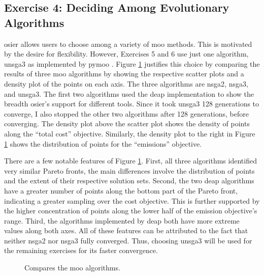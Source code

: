 \subsection{Exercise 4: Deciding Among Evolutionary Algorithms}

\ac{osier} allows users to choose among a variety of \ac{moo} methods. This is
motivated by the desire for flexibility. However, Exercises 5 and 6 use just one
algorithm, \ac{unsga3} as implemented by \ac{pymoo} \cite{blank_pymoo_2020}. Figure
\ref{fig:algorithm-comparison} justifies this choice by comparing the results of
three \ac{moo} algorithms by showing the respective scatter plots and a density
plot of the points on each axis. The three algorithms are \ac{nsga2},
\ac{nsga3}, and \ac{unsga3}. The first two algorithms used the \ac{deap} \cite{fortin_deap_2012}
implementation to show the breadth \ac{osier}'s support for different tools.
Since it took \ac{unsga3} 128 generations to converge, I also stopped the other
two algorithms after 128 generations, before converging. The density plot above
the scatter plot shows the density of points along the ``total cost'' objective.
Similarly, the density plot to the right in Figure
\ref{fig:algorithm-comparison} shows the distribution of points for the
``emissions'' objective.

There are a few notable features of Figure \ref{fig:algorithm-comparison}.
First, all three algorithms identified very similar Pareto fronts, the main
differences involve the distribution of points and the extent of their
respective solution sets. Second, the two \ac{deap} algorithms have a greater
number of points along the bottom part of the Pareto front, indicating a greater
sampling over the cost objective. This is further supported by the higher
concentration of points along the lower half of the emission objective's range.
Third, the algorithms implemented by \ac{deap} both have more extreme values
along both axes. All of these features can be attributed to the fact that
neither \ac{nsga2} nor \ac{nsga3} fully converged. Thus, choosing \ac{unsga3}
will be used for the remaining exercises for its faster convergence.

\begin{figure}[ht]
  \centering
  \resizebox{0.75\columnwidth}{!}{}
  \caption{Compares the \ac{moo} algorithms.}
  \label{fig:algorithm-comparison}
\end{figure}

\FloatBarrier

